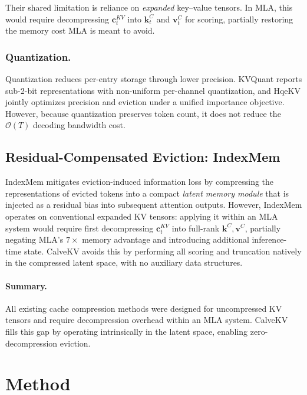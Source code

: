 \documentclass[letterpaper]{article} %
\begin{document}
Their shared limitation is reliance on \emph{expanded} key--value tensors. In
MLA, this would require decompressing $\mathbf{c}_{t}^{KV}$ into
$\mathbf{k}_{t}^{C}$ and $\mathbf{v}_{t}^{C}$ for scoring, partially restoring the
memory cost MLA is meant to avoid.

\subsubsection{Quantization.}
Quantization reduces per-entry storage through lower precision. KVQuant
\cite{hooper2024kvquant} reports sub-2-bit representations with non-uniform
per-channel quantization, and HqeKV \cite{yang2024hqekv} jointly optimizes
precision and eviction under a unified importance objective. However, because
quantization preserves token count, it does not reduce the
$\mathcal{O}(T)$ decoding bandwidth cost.

\subsection{Residual-Compensated Eviction: IndexMem}

IndexMem \cite{indexmem2024} mitigates eviction-induced information loss by
compressing the representations of evicted tokens into a compact
\emph{latent memory module} that is injected as a residual bias into subsequent
attention outputs.  However, IndexMem operates on conventional expanded KV
tensors: applying it within an MLA system would require first decompressing
$\mathbf{c}_{t}^{KV}$ into full-rank $\mathbf{k}^C,\mathbf{v}^C$, partially
negating MLA's $7\times$ memory advantage and introducing additional
inference-time state.  CalveKV avoids this by performing all scoring and
truncation natively in the compressed latent space, with no auxiliary
data structures.

\paragraph{Summary.}
All existing cache compression methods were designed for uncompressed KV
tensors and require decompression overhead within an MLA system.  CalveKV
fills this gap by operating intrinsically in the latent space, enabling
zero-decompression eviction.

\section{Method}
\end{document}
